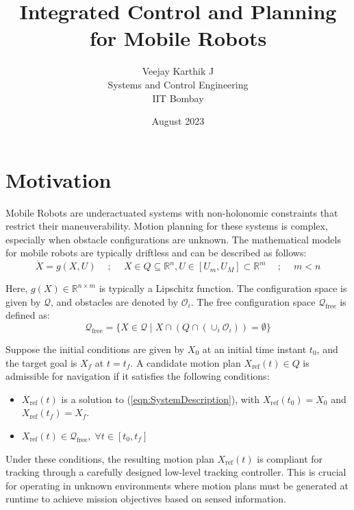 \documentclass{article}
\title{Integrated Control and Planning for Mobile Robots}
\author{Veejay Karthik J\\ Systems and Control Engineering\\ IIT Bombay}
\date{August 2023}
\begin{document}
    \maketitle
    
    \section{Motivation}
    
    Mobile Robots are underactuated systems with non-holonomic constraints that restrict their maneuverability. Motion planning for these systems is complex, especially when obstacle configurations are unknown. The mathematical models for mobile robots are typically driftless and can be described as follows:
    \begin{equation}
    \dot{X} = g(X,U) \quad~;~\quad X \in Q \subseteq \mathbb{R}^n, U\in [U_m,U_M]\subset\mathbb{R}^m \quad~;~\quad m < n
    \label{eqn:SystemDescription}
    \end{equation}
    
    Here, $g(X)\in \mathbb{R}^{n\times m}$ is typically a Lipschitz function. The configuration space is given by $\mathcal{Q}$, and obstacles are denoted by $\mathcal{O}_i$. The free configuration space $\mathcal{Q}_{\text{free}}$ is defined as:
    \begin{equation}
    \mathcal{Q}_{\text{free}} = \{X\in\mathcal{Q}\;|\; X\cap\left(Q\cap (\cup_i \mathcal{O}_i)\right) = \emptyset \}
    \label{eqn:FreeWorkspaces}
    \end{equation}
    
    Suppose the initial conditions are given by $X_0$ at an initial time instant $t_0$, and the target goal is $X_f$ at $t=t_f$. A candidate motion plan $X_{\text{ref}}(t) \in Q$ is admissible for navigation if it satisfies the following conditions:
    \begin{itemize}
    \item $X_{\text{ref}}(t)$ is a solution to (\ref{eqn:SystemDescription}), with $X_{\text{ref}}(t_0) = X_0$ and $X_{\text{ref}}(t_f) = X_f$.
    \item $X_{\text{ref}}(t) \in \mathcal{Q}_{\text{free}},\; \forall t\in[t_0,t_f]$
    \end{itemize}
    
    Under these conditions, the resulting motion plan $X_{\text{ref}}(t)$ is compliant for tracking through a carefully designed low-level tracking controller. This is crucial for operating in unknown environments where motion plans must be generated at runtime to achieve mission objectives based on sensed information.
    
\end{document}
